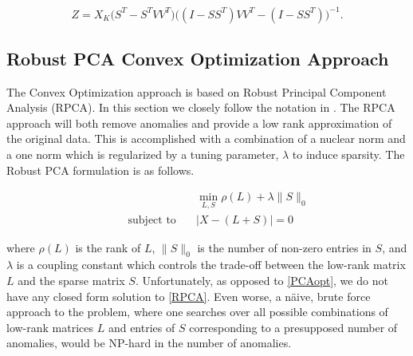 \documentclass[conference]{IEEEtran}
\begin{document}
$$Z= X_K \bigg(S^T - S^T V V^T\bigg) \bigg((I-S S^T)V V^T - (I-S S^T)\bigg)^{-1}.$$ 
%
%
%
%
%


\subsection{Robust PCA Convex Optimization Approach}
The Convex Optimization approach is based on Robust Principal Component Analysis (RPCA). In this section we closely follow the notation in \cite{Paffenroth2012a,Paffenroth2013b,paffenroth2018robust}. The RPCA approach will both remove anomalies and provide a low rank approximation of the original data. This is accomplished with a combination of a nuclear norm and a one norm which is regularized by a tuning parameter, $\lambda$ to induce sparsity. The Robust PCA formulation is as follows.

\begin{align} \label{RPCA}
  &\min_{L,S}\rho(L)+\lambda\|S\|_{0}\\ \nonumber
  \qquad \text{subject to} \quad &
                                   |X-(L+S)| = 0
\end{align}

\noindent where $\rho(L)$ is the rank of $L$, $\|S\|_{0}$ is the
number of non-zero entries in $S$, and $\lambda$ is a coupling
constant which controls the trade-off between the low-rank matrix $L$
and the sparse matrix $S$.  Unfortunately, as opposed to
\eqref{PCAopt}, we do not have any closed form solution to
\eqref{RPCA}.   Even worse, a n\"{a}ive, brute force
approach to the problem, where one searches over all possible
combinations of low-rank matrices $L$ and entries of $S$ corresponding
to a presupposed number of anomalies, would be NP-hard in the number
of anomalies.
\end{document}
